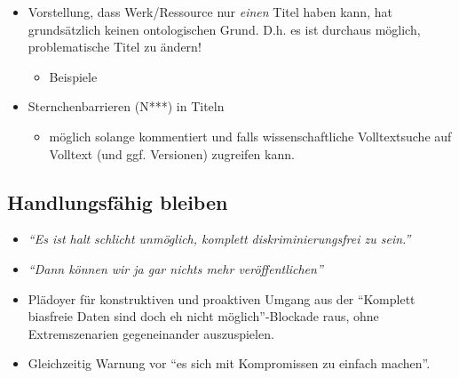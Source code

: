\documentclass[
  letterpaper,
  DIV=11,
  numbers=noendperiod]{scrartcl}
\providecommand{\tightlist}{%
  \setlength{\itemsep}{0pt}\setlength{\parskip}{0pt}}\usepackage{longtable,booktabs,array}
\begin{document}
\begin{tcolorbox}[enhanced jigsaw, colbacktitle=quarto-callout-tip-color!10!white, rightrule=.15mm, coltitle=black, left=2mm, opacitybacktitle=0.6, toptitle=1mm, title=\textcolor{quarto-callout-tip-color}{\faLightbulb}\hspace{0.5em}{Umgang mit Zitaten und Titeln}, colback=white, colframe=quarto-callout-tip-color-frame, opacityback=0, titlerule=0mm, leftrule=.75mm, breakable, bottomtitle=1mm, bottomrule=.15mm, arc=.35mm, toprule=.15mm]

\begin{itemize}
\tightlist
\item
  Vorstellung, dass Werk/Ressource nur \emph{einen} Titel haben kann,
  hat grundsätzlich keinen ontologischen Grund. D.h. es ist durchaus
  möglich, problematische Titel zu ändern!

  \begin{itemize}
  \tightlist
  \item
    Beispiele
  \end{itemize}
\item
  Sternchenbarrieren (N***) in Titeln

  \begin{itemize}
  \tightlist
  \item
    möglich solange kommentiert und falls wissenschaftliche
    Volltextsuche auf Volltext (und ggf. Versionen) zugreifen kann.
  \end{itemize}
\end{itemize}

\end{tcolorbox}

\subsection{Handlungsfähig bleiben}\label{handlungsfuxe4hig-bleiben}

\begin{itemize}
\tightlist
\item
  \emph{``Es ist halt schlicht unmöglich, komplett diskriminierungsfrei
  zu sein.''}
\item
  \emph{``Dann können wir ja gar nichts mehr veröffentlichen''}
\item
  Plädoyer für konstruktiven und proaktiven Umgang aus der ``Komplett
  biasfreie Daten sind doch eh nicht möglich''-Blockade raus, ohne
  Extremszenarien gegeneinander auszuspielen.
\item
  Gleichzeitig Warnung vor ``es sich mit Kompromissen zu einfach
  machen''.
\end{itemize}
\end{document}
